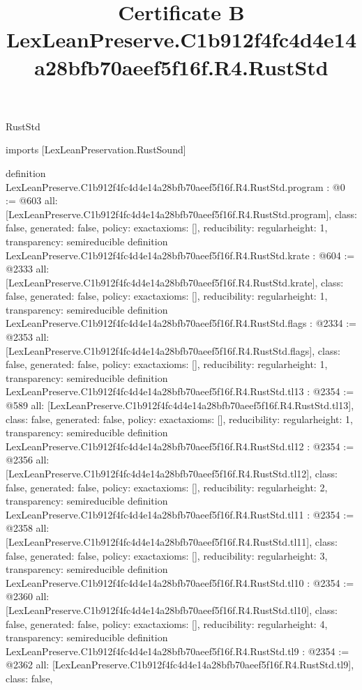 \begin{lexlean}{RustStd}
\title{Certificate B LexLeanPreserve.C1b912f4fc4d4e14a28bfb70aeef5f16f.R4.RustStd}
\begin{coremodule}
imports [LexLeanPreservation.RustSound]

definition LexLeanPreserve.C1b912f4fc4d4e14a28bfb70aeef5f16f.R4.RustStd.program : @0 := @603 {
  all: [LexLeanPreserve.C1b912f4fc4d4e14a28bfb70aeef5f16f.R4.RustStd.program],
  class: false,
  generated: false,
  policy: exact{axioms: []},
  reducibility: regular{height: 1},
  transparency: semireducible
}
definition LexLeanPreserve.C1b912f4fc4d4e14a28bfb70aeef5f16f.R4.RustStd.krate : @604 := @2333 {
  all: [LexLeanPreserve.C1b912f4fc4d4e14a28bfb70aeef5f16f.R4.RustStd.krate],
  class: false,
  generated: false,
  policy: exact{axioms: []},
  reducibility: regular{height: 1},
  transparency: semireducible
}
definition LexLeanPreserve.C1b912f4fc4d4e14a28bfb70aeef5f16f.R4.RustStd.flags : @2334 := @2353 {
  all: [LexLeanPreserve.C1b912f4fc4d4e14a28bfb70aeef5f16f.R4.RustStd.flags],
  class: false,
  generated: false,
  policy: exact{axioms: []},
  reducibility: regular{height: 1},
  transparency: semireducible
}
definition LexLeanPreserve.C1b912f4fc4d4e14a28bfb70aeef5f16f.R4.RustStd.tl13 : @2354 := @589 {
  all: [LexLeanPreserve.C1b912f4fc4d4e14a28bfb70aeef5f16f.R4.RustStd.tl13],
  class: false,
  generated: false,
  policy: exact{axioms: []},
  reducibility: regular{height: 1},
  transparency: semireducible
}
definition LexLeanPreserve.C1b912f4fc4d4e14a28bfb70aeef5f16f.R4.RustStd.tl12 : @2354 := @2356 {
  all: [LexLeanPreserve.C1b912f4fc4d4e14a28bfb70aeef5f16f.R4.RustStd.tl12],
  class: false,
  generated: false,
  policy: exact{axioms: []},
  reducibility: regular{height: 2},
  transparency: semireducible
}
definition LexLeanPreserve.C1b912f4fc4d4e14a28bfb70aeef5f16f.R4.RustStd.tl11 : @2354 := @2358 {
  all: [LexLeanPreserve.C1b912f4fc4d4e14a28bfb70aeef5f16f.R4.RustStd.tl11],
  class: false,
  generated: false,
  policy: exact{axioms: []},
  reducibility: regular{height: 3},
  transparency: semireducible
}
definition LexLeanPreserve.C1b912f4fc4d4e14a28bfb70aeef5f16f.R4.RustStd.tl10 : @2354 := @2360 {
  all: [LexLeanPreserve.C1b912f4fc4d4e14a28bfb70aeef5f16f.R4.RustStd.tl10],
  class: false,
  generated: false,
  policy: exact{axioms: []},
  reducibility: regular{height: 4},
  transparency: semireducible
}
definition LexLeanPreserve.C1b912f4fc4d4e14a28bfb70aeef5f16f.R4.RustStd.tl9 : @2354 := @2362 {
  all: [LexLeanPreserve.C1b912f4fc4d4e14a28bfb70aeef5f16f.R4.RustStd.tl9],
  class: false,
}
\end{coremodule}
\end{lexlean}
